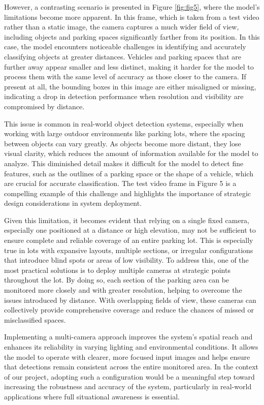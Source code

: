 \documentclass[conference]{IEEEtran}
\begin{document}
However, a contrasting scenario is presented in Figure \ref{fig:fig5}, where the model's limitations become more apparent. In this frame, which is taken from a test video rather than a static image, the camera captures a much wider field of view, including objects and parking spaces significantly farther from its position. In this case, the model encounters noticeable challenges in identifying and accurately classifying objects at greater distances. Vehicles and parking spaces that are further away appear smaller and less distinct, making it harder for the model to process them with the same level of accuracy as those closer to the camera. If present at all, the bounding boxes in this image are either misaligned or missing, indicating a drop in detection performance when resolution and visibility are compromised by distance.

This issue is common in real-world object detection systems, especially when working with large outdoor environments like parking lots, where the spacing between objects can vary greatly. As objects become more distant, they lose visual clarity, which reduces the amount of information available for the model to analyze. This diminished detail makes it difficult for the model to detect fine features, such as the outlines of a parking space or the shape of a vehicle, which are crucial for accurate classification. The test video frame in Figure 5 is a compelling example of this challenge and highlights the importance of strategic design considerations in system deployment.

Given this limitation, it becomes evident that relying on a single fixed camera, especially one positioned at a distance or high elevation, may not be sufficient to ensure complete and reliable coverage of an entire parking lot. This is especially true in lots with expansive layouts, multiple sections, or irregular configurations that introduce blind spots or areas of low visibility. To address this, one of the most practical solutions is to deploy multiple cameras at strategic points throughout the lot. By doing so, each section of the parking area can be monitored more closely and with greater resolution, helping to overcome the issues introduced by distance. With overlapping fields of view, these cameras can collectively provide comprehensive coverage and reduce the chances of missed or misclassified spaces.

Implementing a multi-camera approach improves the system’s spatial reach and enhances its reliability in varying lighting and environmental conditions. It allows the model to operate with clearer, more focused input images and helps ensure that detections remain consistent across the entire monitored area. In the context of our project, adopting such a configuration would be a meaningful step toward increasing the robustness and accuracy of the system, particularly in real-world applications where full situational awareness is essential.
\end{document}
